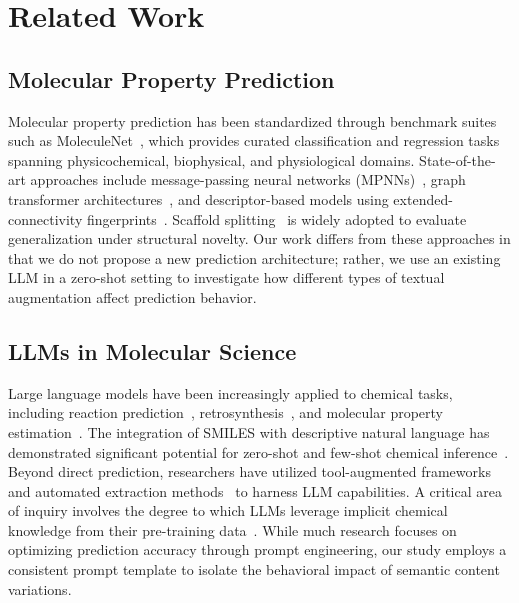 \section{Related Work}
\label{sec:related_work}

\subsection{Molecular Property Prediction}
Molecular property prediction has been standardized through benchmark suites such as MoleculeNet~\cite{wu2018moleculenet}, which provides curated classification and regression tasks spanning physicochemical, biophysical, and physiological domains. State-of-the-art approaches include message-passing neural networks (MPNNs)~\cite{gilmer2017neural}, graph transformer architectures~\cite{ying2021transformers}, and descriptor-based models using extended-connectivity fingerprints~\cite{rogers2010extended}. Scaffold splitting~\cite{bemis1996properties} is widely adopted to evaluate generalization under structural novelty. Our work differs from these approaches in that we do not propose a new prediction architecture; rather, we use an existing LLM in a zero-shot setting to investigate how different types of textual augmentation affect prediction behavior.

\subsection{LLMs in Molecular Science}
Large language models have been increasingly applied to chemical tasks, including reaction prediction~\cite{schwaller2019molecular}, retrosynthesis~\cite{han2024retrosynthesis}, and molecular property estimation~\cite{guo2023benchmark, ross2022large}. The integration of SMILES with descriptive natural language has demonstrated significant potential for zero-shot and few-shot chemical inference~\cite{edwards2022text2mol}. Beyond direct prediction, researchers have utilized tool-augmented frameworks~\cite{bran2024chemcrow} and automated extraction methods~\cite{polak2024extracting} to harness LLM capabilities. A critical area of inquiry involves the degree to which LLMs leverage implicit chemical knowledge from their pre-training data~\cite{white2023assessment}. While much research focuses on optimizing prediction accuracy through prompt engineering, our study employs a consistent prompt template to isolate the behavioral impact of semantic content variations.

